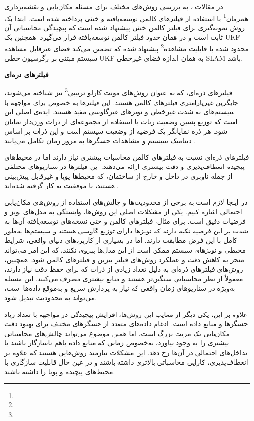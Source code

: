  
در مقالات 
\cite{huang2013quadratic, kim2008unscented, cheng2014compressed}
، به بررسی روش‌های مختلف برای مسئله مکان‌یابی و نقشه‌برداری همزمان\footnote{}
 با استفاده از فیلترهای کالمن توسعه‌یافته و خنثی پرداخته شده است. ابتدا یک روش نمونه‌گیری برای فیلتر کالمن خنثی پیشنهاد شده است که پیچیدگی محاسباتی آن ثابت است و در همان حدود فیلتر کالمن توسعه‌یافته قرار می‌گیرد. همچنین یک UKF محدود شده با قابلیت مشاهده\footnote{} پیشنهاد شده که تضمین می‌کند فضای غیرقابل مشاهده سیستم مبتنی بر رگرسیون خطی UKF به همان اندازه فضای غیرخطی SLAM باشد.
 

\textbf {فیلترهای ذره‌ای}

فیلترهای ذره‌ای، که به عنوان روش‌های مونت کارلو ترتیبی\footnote{}
 نیز شناخته می‌شوند، جایگزین غیرپارامتری فیلترهای کالمن هستند. این فیلترها به خصوص برای مواجهه با سیستم‌های به شدت غیرخطی و نویزهای غیرگاوسی مفید هستند. ایده‌ی اصلی این است که توزیع پسین وضعیت ربات با استفاده از مجموعه‌ای از ذرات وزن‌دار نمایان شود. هر ذره نمایانگر یک فرضیه از وضعیت سیستم است و این ذرات بر اساس دینامیک سیستم و مشاهدات حسگرها به مرور زمان تکامل می‌یابند
\cite{fox2001particle}.

فیلترهای ذره‌ای نسبت به فیلترهای کالمن محاسبات بیشتری نیاز دارند اما در محیط‌های پیچیده انعطاف‌پذیری و دقت بیشتری ارائه می‌دهند. این فیلترها در سناریوهای مختلفی از جمله ناوبری در داخل و خارج از ساختمان، که محیط‌ها پویا و غیرقابل پیش‌بینی هستند، با موفقیت به کار گرفته شده‌اند
 \cite{fox2001particle, montemerlo2002conditional, kwok2003adaptive}.

در اینجا لازم است به برخی از محدودیت‌ها و چالش‌های استفاده از روش‌های مکان‌یابی احتمالی اشاره کنیم. یکی از مشکلات اصلی این روش‌ها، وابستگی به مدل‌های نویز و فرضیات دقیق است. برای مثال، فیلترهای کالمن و حتی نسخه‌های توسعه‌یافته آن‌ها به شدت بر این فرضیه تکیه دارند که نویزها دارای توزیع گاوسی هستند و سیستم‌ها به‌طور کامل با این فرض مطابقت دارند. اما در بسیاری از کاربردهای دنیای واقعی، شرایط محیطی و نویزهای سیستم ممکن است از این مدل‌ها پیروی نکنند، که این امر می‌تواند منجر به کاهش دقت و عملکرد روش‌های فیلتر بیزین و فیلترهای کالمن شود. همچنین، روش‌های فیلترهای ذره‌ای به دلیل تعداد زیادی از ذرات که برای حفظ دقت نیاز دارند، معمولاً از نظر محاسباتی سنگین‌تر هستند و منابع بیشتری مصرف می‌کنند. این مسئله به‌ویژه در سناریوهای زمان واقعی که نیاز به پردازش سریع و به‌موقع داده‌ها است، می‌تواند به محدودیت تبدیل شود.

علاوه بر این، یکی دیگر از معایب این روش‌ها، افزایش پیچیدگی در مواجهه با تعداد زیاد حسگرها و منابع داده است. ادغام داده‌های متعدد از حسگرهای مختلف برای بهبود دقت مکان‌یابی یک مزیت بزرگ است، اما همین موضوع می‌تواند چالش‌های محاسباتی بیشتری را به وجود بیاورد، به‌خصوص زمانی که منابع داده باهم ناسازگار باشند یا تداخل‌های احتمالی در آن‌ها رخ دهد. این مشکلات نیازمند روش‌هایی هستند که علاوه بر انعطاف‌پذیری، کارایی محاسباتی بالاتری داشته باشند و در عین حال قابلیت سازگاری با محیط‌های پیچیده و پویا را داشته باشند.

